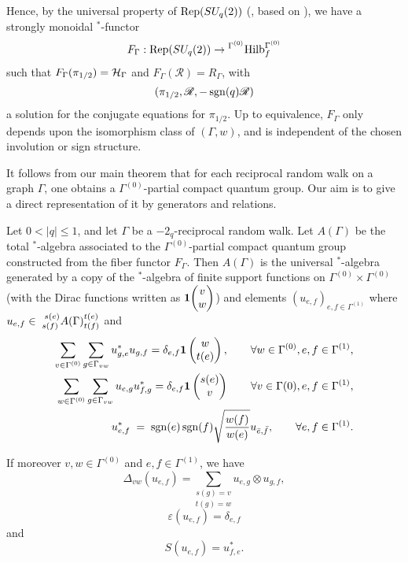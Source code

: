 

Hence, by the universal property of $\Rep(SU_q(2))$ (\cite[Theorem 1.4]{DCY1}, based on \cite{Tur1,Eti1,Yam1,Pin2,Pin3}), we have a strongly monoidal $^*$-functor
\[F_{\Gamma}: \Rep(SU_q(2)) \rightarrow {}^{\Gamma^{(0)}}\Hilb_f^{\Gamma^{(0)}}\] such that $F_{\Gamma}(\pi_{1/2}) = \Hsp_{\Gamma}$ and $F_{\Gamma}(\mathscr{R}) = R_{\Gamma}$, with \[(\pi_{1/2},\mathscr{R},-\sgn(q)\mathscr{R})\] a solution for the conjugate equations for $\pi_{1/2}$. Up to equivalence, $F_{\Gamma}$ only depends upon the isomorphism class of $(\Gamma,w)$, and is independent of the chosen involution or sign structure.

It follows from our main theorem that for each reciprocal random walk on a graph $\Gamma$, one obtains a $\Gamma^{(0)}$-partial compact quantum group. Our aim is to give a direct representation of it by generators and relations.

\begin{Theorem}\label{TheoGenRel} Let $0<|q|\leq 1$, and let $\Gamma$ be a $-2_q$-reciprocal random walk. Let $A(\Gamma)$ be the total $^*$-algebra associated to the $\Gamma^{(0)}$-partial compact quantum group constructed from the fiber functor $F_{\Gamma}$. Then $A(\Gamma)$ is the universal $^*$-algebra generated by a copy of the $^*$-algebra of finite support functions on $\Gamma^{(0)}\times \Gamma^{(0)}$ (with the Dirac functions written as $\UnitC{v}{w}$) and elements $(u_{e,f})_{e,f\in \Gamma^{(1)}}$ where $u_{e,f}\in \Gr{A(\Gamma)}{s(e)}{t(e)}{s(f)}{t(f)}$ and 
\begin{eqnarray} 
\label{EqUni1}\sum_{v\in \Gamma^{(0)}}\sum_{g\in \Gamma_{vw}} u_{g,e}^*u_{g,f} = \delta_{e,f}\mathbf{1}\Grru{w}{t(e)}, \qquad \forall w\in \Gamma^{(0)}, e,f\in \Gamma^{(1)},\\
\label{EqUni2}\sum_{w\in \Gamma^{(0)}} \sum_{g\in \Gamma_{vw}} u_{e,g}u_{f,g}^* = \delta_{e,f} \mathbf{1}\Grru{s(e)}{v}\qquad \forall v\in \Gamma{(0)}, e,f\in \Gamma^{(1)},\\ 
\label{EqInt}u_{e,f}^* \;=\; \sgn(e)\sgn(f)\sqrt{\frac{w(f)}{w(e)}} u_{\bar{e},\bar{f}},\qquad \forall e,f\in \Gamma^{(1)}.
\end{eqnarray}

If moreover $v,w\in \Gamma^{(0)}$ and $e,f\in \Gamma^{(1)}$, we have \[\Delta_{vw}(u_{e,f}) = \underset{t(g) = w}{\sum_{s(g) = v}} u_{e,g}\otimes u_{g,f},\]
\[\varepsilon(u_{e,f}) = \delta_{e,f}\] and \[S(u_{e,f}) = u_{f,e}^*.\] 
\end{Theorem} 

